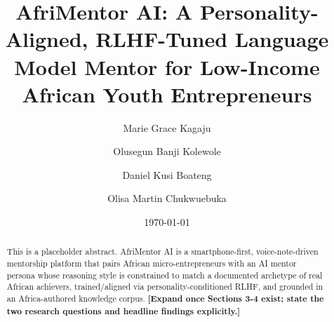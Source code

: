 \documentclass[11pt]{article}
\title{AfriMentor AI: A Personality-Aligned, RLHF-Tuned Language Model Mentor for Low-Income African Youth Entrepreneurs}
\author[1]{Marie Grace Kagaju}
\author[1]{Olusegun Banji Kolewole}
\author[1]{Daniel Kusi Boateng}
\author[1]{Olisa Martin Chukwuebuka}
\affil[1]{AfriMentor AI Project}
\date{\today}
\begin{document}
\maketitle

\begin{abstract}
This is a placeholder abstract. AfriMentor AI is a smartphone-first,
voice-note-driven mentorship platform that pairs African micro-entrepreneurs
with an AI mentor persona whose reasoning style is constrained to match a
documented archetype of real African achievers, trained/aligned via
personality-conditioned RLHF, and grounded in an Africa-authored knowledge
corpus. \textbf{[Expand once Sections 3-4 exist; state the two research
questions and headline findings explicitly.]}
\end{abstract}












\appendix

\end{document}
